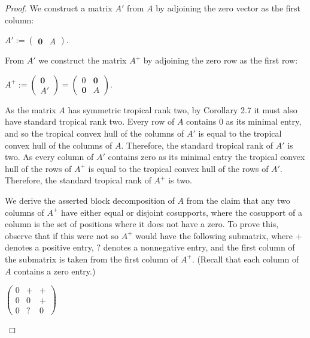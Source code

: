 \documentclass{article}
\begin{document}
\begin{proof}
  We construct a matrix $A'$ from $A$ by adjoining the zero vector as the first column:
  
  \begin{center}
    
    $A' := \left(\begin{array}{cc} \textbf{0} & A \end{array}\right)$.
    
  \end{center}
  
  From $A'$ we construct the matrix $A^{+}$ by adjoining the zero row as the first row:
  
  \begin{center}
    
    $A^{+} := \left(\begin{array}{c} \textbf{0} \\ A' \end{array}\right) = \left(\begin{array}{cc} 0 & \textbf{0} \\ \textbf{0} & A \end{array}\right)$.
    
  \end{center}
  
  As the matrix $A$ has symmetric tropical rank two, by Corollary 2.7 it must also have standard tropical rank two. Every row of $A$ contains $0$ as its minimal entry, and so the tropical convex hull of the columns of $A'$ is equal to the tropical convex hull of the columns of $A$. Therefore, the standard tropical rank of $A'$ is two. As every column of $A'$ contains zero as its minimal entry the tropical convex hull of the rows of $A^{+}$ is equal to the tropical convex hull of the rows of $A'$. Therefore, the standard tropical rank of $A^{+}$ is two.

  We derive the asserted block decomposition of $A$ from the claim that any two columns of $A^{+}$ have either equal or disjoint cosupports, where the cosupport of a column is the set of positions where it does not have a zero. To prove this, observe that if this were not so $A^{+}$ would have the following submatrix, where $+$ denotes a positive entry, $?$ denotes a nonnegative entry, and the first column of the submatrix is taken from the first column of $A^{+}$. (Recall that each column of $A$ contains a zero entry.)

  \begin{center}

    $\left(\begin{array}{ccc} 0 & + & + \\ 0 & 0 & + \\ 0 & ? & 0 \end{array}\right)$


\end{center}
\end{proof}
\end{document}
